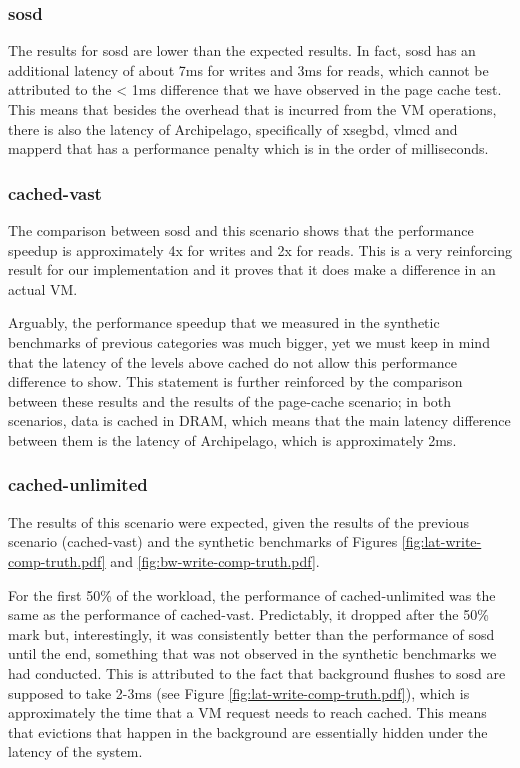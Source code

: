 \subsubsection{sosd}

The results for sosd are lower than the expected results. In fact, sosd has an 
additional latency of about 7ms for writes and 3ms for reads, which cannot be 
attributed to the < 1ms difference that we have observed in the page cache 
test. This means that besides the overhead that is incurred from the VM 
operations, there is also the latency of Archipelago, specifically of xsegbd, 
vlmcd and mapperd that has a performance penalty which is in the order of 
milliseconds.

\subsubsection{cached-vast}

The comparison between sosd and this scenario shows that the performance 
speedup is approximately 4x for writes and 2x for reads. This is a very 
reinforcing result for our implementation and it proves that it does make a 
difference in an actual VM.

Arguably, the performance speedup that we measured in the synthetic benchmarks 
of previous categories was much bigger, yet we must keep in mind that the 
latency of the levels above cached do not allow this performance difference to 
show.  This statement is further reinforced by the comparison between these 
results and the results of the page-cache scenario; in both scenarios, data is 
cached in DRAM, which means that the main latency difference between them is 
the latency of Archipelago, which is approximately 2ms.

\subsubsection{cached-unlimited}

The results of this scenario were expected, given the results of the previous 
scenario (cached-vast) and the synthetic benchmarks of Figures 
\ref{fig:lat-write-comp-truth.pdf} and \ref{fig:bw-write-comp-truth.pdf}.

For the first 50\% of the workload, the performance of cached-unlimited was the 
same as the performance of cached-vast. Predictably, it dropped after the 50\% 
mark but, interestingly, it was consistently better than the performance of 
sosd until the end, something that was not observed in the synthetic benchmarks 
we had conducted.  This is attributed to the fact that background flushes to 
sosd are supposed to take 2-3ms (see Figure 
\ref{fig:lat-write-comp-truth.pdf}), which is approximately the time that a VM 
request needs to reach cached.  This means that evictions that happen in the 
background are essentially hidden under the latency of the system.

